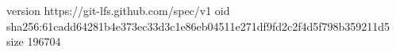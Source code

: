 version https://git-lfs.github.com/spec/v1
oid sha256:61cadd64281b4e373ec33d3c1e86eb04511e271df9fd2c2f4d5f798b359211d5
size 196704
